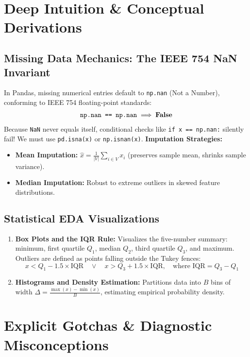 \section{Deep Intuition \& Conceptual Derivations}

\subsection{Missing Data Mechanics: The IEEE 754 NaN Invariant}
In Pandas, missing numerical entries default to \texttt{np.nan} (Not a Number), conforming to IEEE 754 floating-point standards:
\begin{equation}
\text{\texttt{np.nan == np.nan}} \implies \mathbf{False}
\end{equation}
Because \texttt{NaN} never equals itself, conditional checks like \texttt{if x == np.nan:} silently fail! We must use \texttt{pd.isna(x)} or \texttt{np.isnan(x)}.
\textbf{Imputation Strategies:}
\begin{itemize}
    \item \textbf{Mean Imputation:} $\hat{x} = \frac{1}{|V|} \sum_{i \in V} x_i$ (preserves sample mean, shrinks sample variance).
    \item \textbf{Median Imputation:} Robust to extreme outliers in skewed feature distributions.
\end{itemize}

\subsection{Statistical EDA Visualizations}
\begin{enumerate}
    \item \textbf{Box Plots and the IQR Rule:} Visualizes the five-number summary: minimum, first quartile $Q_1$, median $Q_2$, third quartile $Q_3$, and maximum. Outliers are defined as points falling outside the Tukey fences:
    \begin{equation}
    x < Q_1 - 1.5 \times \text{IQR} \quad \lor \quad x > Q_3 + 1.5 \times \text{IQR}, \quad \text{where } \text{IQR} = Q_3 - Q_1
    \end{equation}
    \item \textbf{Histograms and Density Estimation:} Partitions data into $B$ bins of width $\Delta = \frac{\max(x) - \min(x)}{B}$, estimating empirical probability density.
\end{enumerate}

\section{Explicit Gotchas \& Diagnostic Misconceptions}

